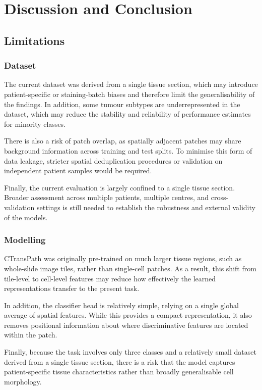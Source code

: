 \documentclass[11pt,a4paper]{article}
\begin{document}
\section{Discussion and Conclusion}

\subsection{Limitations}

\subsubsection{Dataset}

The current dataset was derived from a single tissue section, which may introduce patient-specific or staining-batch biases and therefore limit the generalisability of the findings. In addition, some tumour subtypes are underrepresented in the dataset, which may reduce the stability and reliability of performance estimates for minority classes.

There is also a risk of patch overlap, as spatially adjacent patches may share background information across training and test splits. To minimise this form of data leakage, stricter spatial deduplication procedures or validation on independent patient samples would be required.

Finally, the current evaluation is largely confined to a single tissue section. Broader assessment across multiple patients, multiple centres, and cross-validation settings is still needed to establish the robustness and external validity of the models.

\subsubsection{Modelling}

    CTransPath was originally pre-trained on much larger tissue regions, such as whole-slide image tiles, rather than single-cell patches. As a result, this shift from tile-level to cell-level features may reduce how effectively the learned representations transfer to the present task.

    In addition, the classifier head is relatively simple, relying on a single global average of spatial features. While this provides a compact representation, it also removes positional information about where discriminative features are located within the patch.
    
    Finally, because the task involves only three classes and a relatively small dataset derived from a single tissue section, there is a risk that the model captures patient-specific tissue characteristics rather than broadly generalisable cell morphology.
    
\end{document}
